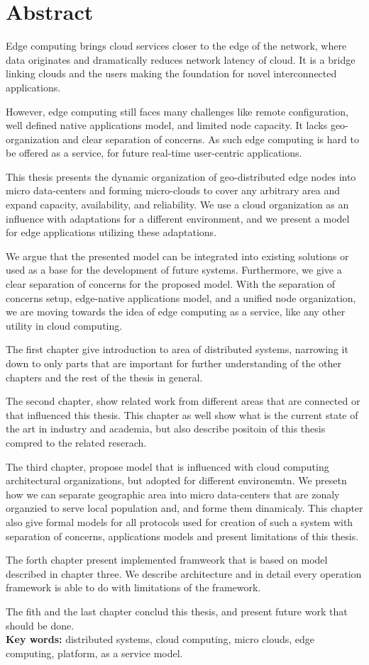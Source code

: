 \chapter*{Abstract}
Edge computing brings cloud services closer to the edge of the network, where data originates and dramatically reduces network latency of cloud. It is a bridge linking clouds and the users making the foundation for novel interconnected applications.

However, edge computing still faces many challenges like remote configuration, well defined native applications model, and limited node capacity. It lacks geo-organization and clear separation of concerns. As such edge computing is hard to be offered as a service, for future real-time user-centric applications. 

This thesis presents the dynamic organization of geo-distributed edge nodes into micro data-centers and forming micro-clouds to cover any arbitrary area and expand capacity, availability, and reliability. We use a cloud organization as an influence with adaptations for a different environment, and we present a model for edge applications utilizing these adaptations. 

We argue that the presented model can be integrated into existing solutions or used as a base for the development of future systems. Furthermore, we give a clear separation of concerns for the proposed model. With the separation of concerns setup, edge-native applications model, and a unified node organization, we are moving towards the idea of edge computing as a service, like any other utility in cloud computing. 

The first chapter give introduction to area of distributed systems, narrowing it down to only parts that are important for further understanding of the other chapters and the rest of the thesis in general.

The second chapter, show related work from different areas that are connected or that influenced this thesis. This chapter as well show what is the current state of the art in industry and academia, but also describe positoin of this thesis compred to the related reserach.

The third chapter, propose model that is influenced with cloud computing architectural organizations, but adopted for different environemtn. We presetn how we can separate geographic area into micro data-centers that are zonaly organzied to serve local population and, and forme them dinamicaly. This chapter also give formal models for all protocols used for creation of such a system with separation of concerns, applications models and present limitations of this thesis.

The forth chapter present implemented framweork that is based on model described in chapter three. We describe architecture and in detail every operation framework is able to do with limitations of the framework.

The fith and the last chapter conclud this thesis, and present future work that should be done.\\ 

\noindent
\textbf{Key words:} distributed systems, cloud computing, micro clouds, edge computing, platform, as a service model.